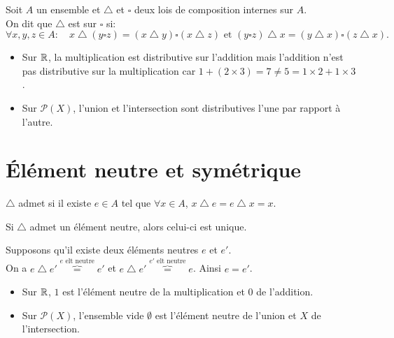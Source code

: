 \documentclass{book}
\begin{document}
\begin{Definition}
Soit $A$ un ensemble et $\bigtriangleup$ et $\square$ deux lois de composition internes sur $A$.\\
On dit que $\bigtriangleup$ est  sur $\square$ si:
$$ \forall x, y, z  \in A :\quad   x \bigtriangleup (y \square z) = (x \bigtriangleup y) \square (x \bigtriangleup z)\text{ et }(y \square z) \bigtriangleup x = (y \bigtriangleup x) \square (z \bigtriangleup x).$$
\end{Definition} 
\begin{Exemple}
\begin{itemize}
\item Sur $\mathbb{R}$, la multiplication est distributive sur l'addition mais l'addition n'est pas distributive sur la multiplication car $1+(2\times3)=7\neq 5=1\times 2+ 1\times 3$.
\item Sur  $\mathcal{P}(X)$, l'union et l'intersection sont distributives l'une par rapport à l'autre.
\end{itemize}
\end{Exemple}
\section{Élément neutre et symétrique}
\begin{Definition}
$\bigtriangleup$ admet  si il existe $ e\in A$ tel que $\forall x\in A$, $x \bigtriangleup e = e \bigtriangleup x = x$.
\end{Definition}
\begin{Proposition}
Si $\bigtriangleup$ admet un élément neutre, alors celui-ci est unique.
\end{Proposition}
\begin{Demonstration}
Supposons qu'il existe deux éléments neutres $ e$ et $e'$.\\
On a $e \bigtriangleup e'\overbrace{=}^{e \text{ elt neutre}}e'$ et $e \bigtriangleup e'\overbrace{=}^{e' \text{ elt neutre}}e$. Ainsi $ e=e'$.
\end{Demonstration}
\begin{Exemple}
\begin{itemize}
\item Sur $\mathbb{R}$, $1$ est l'élément neutre de la multiplication et $0$ de l'addition.
\item Sur  $\mathcal{P}(X)$, l'ensemble vide $\emptyset$ est l'élément neutre de l'union et  $X$ de  l'intersection.
\end{itemize}
\end{Exemple}
\end{document}
